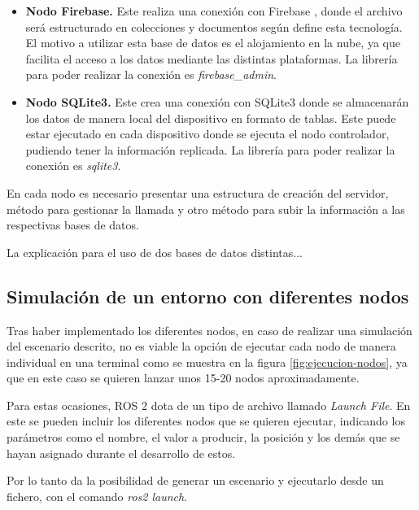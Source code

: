 \begin{itemize}
    \item \textbf{Nodo Firebase.} Este realiza una conexión con Firebase \cite{firebase}, donde el archivo será estructurado en colecciones y documentos según define esta tecnología. El motivo a utilizar esta base de datos es el alojamiento en la nube, ya que facilita el acceso a los datos mediante las distintas plataformas. La librería para poder realizar la conexión es \textit{firebase\_admin}.
    \item \textbf{Nodo SQLite3.} Este crea una conexión con SQLite3 \cite{sqlite3} donde se almacenarán los datos de manera local del dispositivo en formato de tablas. Este puede estar ejecutado en cada dispositivo donde se ejecuta el nodo controlador, pudiendo tener la información replicada. La librería para poder realizar la conexión es \textit{sqlite3}.
\end{itemize}

En cada nodo es necesario presentar una estructura de creación del servidor, método para gestionar la llamada y otro método para subir la información a las respectivas bases de datos. 

La explicación para el uso de dos bases de datos distintas...


\subsection{Simulación de un entorno con diferentes nodos}

Tras haber implementado los diferentes nodos, en caso de realizar una simulación del escenario descrito, no es viable la opción de ejecutar cada nodo de manera individual en una terminal como se muestra en la figura \ref{fig:ejecucion-nodos}, ya que en este caso se quieren lanzar unos 15-20 nodos aproximadamente.

Para estas ocasiones, ROS 2 dota de un tipo de archivo llamado \textit{Launch File}. En este se pueden incluir los diferentes nodos que se quieren ejecutar, indicando los parámetros como el nombre, el valor a producir, la posición y los demás que se hayan asignado durante el desarrollo de estos.

Por lo tanto da la posibilidad de generar un escenario y ejecutarlo desde un fichero, con el comando \textit{ros2 launch}.

